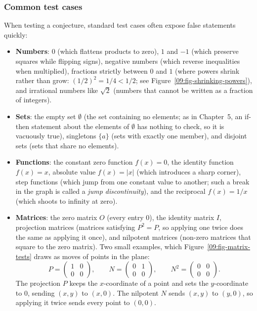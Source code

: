 \subsubsection*{Common test cases}
When testing a conjecture, standard test cases often expose false statements quickly:
\begin{itemize}
\item \textbf{Numbers}: $0$ (which flattens products to zero), $1$ and $-1$ (which preserve squares while flipping signs), negative numbers (which reverse inequalities when multiplied), fractions strictly between $0$ and $1$ (where powers shrink rather than grow: $(1/2)^2 = 1/4 < 1/2$; see Figure~\ref{09:fig-shrinking-powers}), and irrational numbers like $\sqrt{2}$ (numbers that cannot be written as a fraction of integers).
\item \textbf{Sets}: the empty set $\emptyset$ (the set containing no elements; as in Chapter~5, an if-then statement about the elements of $\emptyset$ has nothing to check, so it is vacuously true), singletons $\{a\}$ (sets with exactly one member), and disjoint sets (sets that share no elements).
\item \textbf{Functions}: the constant zero function $f(x) = 0$, the identity function $f(x) = x$, absolute value $f(x) = |x|$ (which introduces a sharp corner), step functions (which jump from one constant value to another; such a break in the graph is called a \emph{jump discontinuity}), and the reciprocal $f(x) = 1/x$ (which shoots to infinity at zero).
\item \textbf{Matrices}: the zero matrix $O$ (every entry $0$), the identity matrix $I$, projection matrices (matrices satisfying $P^2 = P$, so applying one twice does the same as applying it once), and nilpotent matrices (non-zero matrices that square to the zero matrix). Two small examples, which Figure~\ref{09:fig-matrix-tests} draws as moves of points in the plane:
\[
P = \begin{pmatrix} 1 & 0 \\ 0 & 0 \end{pmatrix}, \qquad
N = \begin{pmatrix} 0 & 1 \\ 0 & 0 \end{pmatrix}, \qquad
N^2 = \begin{pmatrix} 0 & 0 \\ 0 & 0 \end{pmatrix}.
\]
The projection $P$ keeps the $x$-coordinate of a point and sets the $y$-coordinate to $0$, sending $(x, y)$ to $(x, 0)$. The nilpotent $N$ sends $(x, y)$ to $(y, 0)$, so applying it twice sends every point to $(0, 0)$.
\end{itemize}

